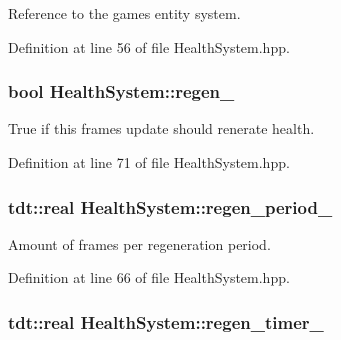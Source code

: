 Reference to the game\textquotesingle{}s entity system. 



Definition at line 56 of file Health\+System.\+hpp.

\subsubsection[{\texorpdfstring{regen\+\_\+}{regen_}}]{\setlength{\rightskip}{0pt plus 5cm}bool Health\+System\+::regen\+\_\+\hspace{0.3cm}{\ttfamily [private]}}\hypertarget{class_health_system_a80ce11376a9356ddb1edb010806655d4}{}\label{class_health_system_a80ce11376a9356ddb1edb010806655d4}


True if this frame\textquotesingle{}s update should renerate health. 



Definition at line 71 of file Health\+System.\+hpp.

\subsubsection[{\texorpdfstring{regen\+\_\+period\+\_\+}{regen_period_}}]{\setlength{\rightskip}{0pt plus 5cm}tdt\+::real Health\+System\+::regen\+\_\+period\+\_\+\hspace{0.3cm}{\ttfamily [private]}}\hypertarget{class_health_system_a20a6116c6307492bc38e892bafaca0f3}{}\label{class_health_system_a20a6116c6307492bc38e892bafaca0f3}


Amount of frames per regeneration period. 



Definition at line 66 of file Health\+System.\+hpp.

\subsubsection[{\texorpdfstring{regen\+\_\+timer\+\_\+}{regen_timer_}}]{\setlength{\rightskip}{0pt plus 5cm}tdt\+::real Health\+System\+::regen\+\_\+timer\+\_\+\hspace{0.3cm}{\ttfamily [private]}}\hypertarget{class_health_system_aa17a75833ba090bd1c0d1cd77d694bca}{}\label{class_health_system_aa17a75833ba090bd1c0d1cd77d694bca}


